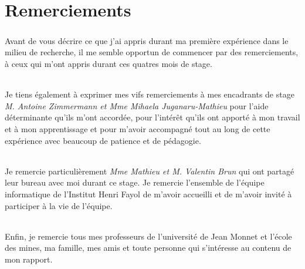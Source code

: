 \chapter{Remerciements}
\paragraph{}
Avant de vous décrire ce que j’ai appris durant ma première expérience dans le milieu de recherche, il me semble opportun de commencer par des remerciements, à ceux qui m’ont appris durant ces quatres mois de stage. 
\subparagraph{}
Je tiens également à exprimer mes vifs remerciements à mes encadrants de stage {\it M. Antoine Zimmermann et Mme Mihaela Juganaru-Mathieu} pour l’aide déterminante qu’ils m’ont accordée, pour l’intérêt qu’ils ont apporté à mon travail et à mon apprentissage et pour m’avoir accompagné tout au long de cette expérience avec beaucoup de patience et de pédagogie.
\subparagraph{}
Je remercie particulièrement {\it Mme Mathieu et M. Valentin Brun} qui ont partagé leur bureau avec moi durant ce stage. 
Je remercie l'ensemble de l'équipe informatique de l'Institut Henri Fayol de m'avoir accueilli et de m'avoir
invité à participer à la vie de l'équipe.
\subparagraph{}
Enfin, je remercie tous mes professeurs de l’université de Jean Monnet et l'école des mines, ma famille, mes amis et toute personne qui s’intéresse au contenu de mon rapport.

